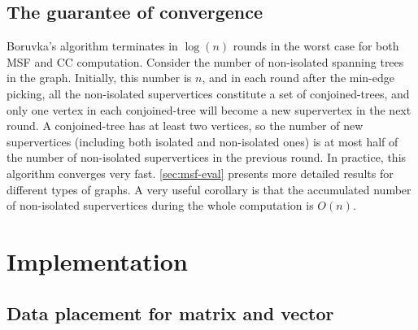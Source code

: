 \documentclass{sokendai_thesis} %
\newcommand{\boruvka}[0]{Boruvka}
\begin{document}
\subsection{The guarantee of convergence}
\label{sec:convergence}

\boruvka{}'s algorithm terminates in $\log(n)$ rounds in the worst case for both MSF and CC computation.
Consider the number of non-isolated spanning trees in the graph.
Initially, this number is $n$, and in each round after the min-edge picking, all the non-isolated supervertices constitute a set of conjoined-trees, and only one vertex in each conjoined-tree will become a new supervertex in the next round.
A conjoined-tree has at least two vertices, so the number of new supervertices (including both isolated and non-isolated ones) is at most half of the number of non-isolated supervertices in the previous round.
In practice, this algorithm converges very fast.
\autoref{sec:msf-eval} presents more detailed results for different types of graphs.
A very useful corollary is that the accumulated number of non-isolated supervertices during the whole computation is $O(n)$.

\section{Implementation}





\subsection{Data placement for matrix and vector}
\label{sec:basic-op}
\end{document}
